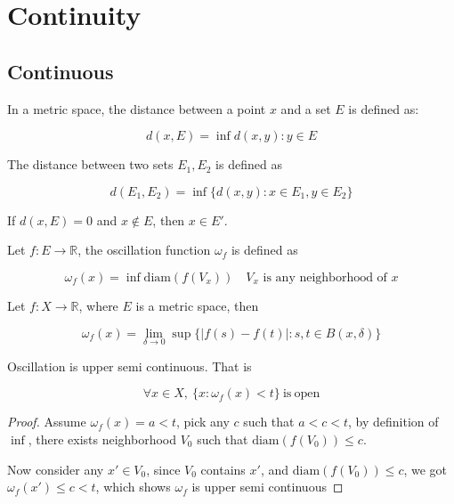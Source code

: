 \section{Continuity}

\subsection{Continuous}

\begin{definition}[Distance]
   In a metric space, the distance between a point $x$ and a set $E$ is defined as:
   
   \[
    d(x, E) = \inf {d(x,y): y \in E}
   \]

   The distance between two sets $E_1, E_2$ is defined as

   \[
    d(E_1, E_2) = \inf \{ d(x,y): x \in E_1, y \in E_2\}
   \]
\end{definition}

\begin{corollary}
    If $d(x, E) = 0$ and $x \notin E$, then $x \in E'$.
\end{corollary}


\begin{definition}[Oscillation]
    Let $f: E \to \mathbb{R}$, the oscillation function $\omega_f$ is defined as

    \[
        \omega_f(x) = \inf \mathrm{diam}(f(V_x)) \quad V_x \text{ is any neighborhood of } x
    \]
\end{definition}

\begin{corollary}
    Let $f: X \to \mathbb{R}$, where $E$ is a metric space, then


    \[
        \omega_f(x) = \lim_{\delta \to 0} \sup \{ \left| f(s) - f(t) \right|: s,t \in B(x, \delta) \}
    \]
\end{corollary}

\begin{thm}
    Oscillation is upper semi continuous. That is

    \[
        \forall x \in X,\: \{x: \omega_f (x) < t \} \mathrm{\ is\ open}
    \]
\end{thm}

\begin{proof}
    Assume $\omega_f(x) = a < t$, pick any $c$ such that $a < c < t$, by definition of $\inf$, 
    there exists neighborhood $V_0$ such that $\mathrm{diam}(f(V_0)) \le c$.

    Now consider any $x' \in V_0$, since $V_0$ contains $x'$, and $\mathrm{diam}(f(V_0)) \le c$,
    we got $\omega_f(x') \le c < t$, which shows $\omega_f$ is upper semi continuous
\end{proof}